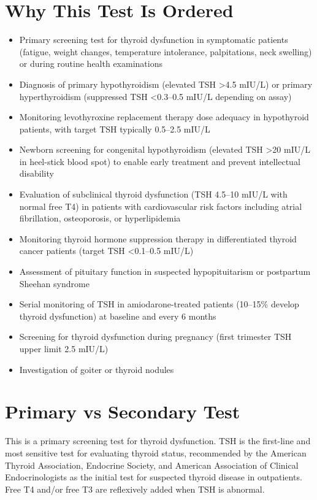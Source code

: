 \section*{Why This Test Is Ordered}
\begin{itemize}
  \item Primary screening test for thyroid dysfunction in symptomatic patients (fatigue, weight changes, temperature intolerance, palpitations, neck swelling) or during routine health examinations
  \item Diagnosis of primary hypothyroidism (elevated TSH >4.5 mIU/L) or primary hyperthyroidism (suppressed TSH <0.3--0.5 mIU/L depending on assay)
  \item Monitoring levothyroxine replacement therapy dose adequacy in hypothyroid patients, with target TSH typically 0.5--2.5 mIU/L
  \item Newborn screening for congenital hypothyroidism (elevated TSH >20 mIU/L in heel-stick blood spot) to enable early treatment and prevent intellectual disability
  \item Evaluation of subclinical thyroid dysfunction (TSH 4.5--10 mIU/L with normal free T4) in patients with cardiovascular risk factors including atrial fibrillation, osteoporosis, or hyperlipidemia
  \item Monitoring thyroid hormone suppression therapy in differentiated thyroid cancer patients (target TSH <0.1--0.5 mIU/L)
  \item Assessment of pituitary function in suspected hypopituitarism or postpartum Sheehan syndrome
  \item Serial monitoring of TSH in amiodarone-treated patients (10--15\% develop thyroid dysfunction) at baseline and every 6 months
  \item Screening for thyroid dysfunction during pregnancy (first trimester TSH upper limit 2.5 mIU/L)
  \item Investigation of goiter or thyroid nodules
\end{itemize}

\section*{Primary vs Secondary Test}
This is a primary screening test for thyroid dysfunction. TSH is the first-line and most sensitive test for evaluating thyroid status, recommended by the American Thyroid Association, Endocrine Society, and American Association of Clinical Endocrinologists as the initial test for suspected thyroid disease in outpatients. Free T4 and/or free T3 are reflexively added when TSH is abnormal.

